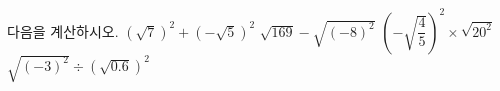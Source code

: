 다음을 계산하시오.
 $(\sqrt{7})^2+(-\sqrt{5})^2$
 $\sqrt{169}-\sqrt{(-8)^2}$
 $\left(-\sqrt{\dfrac{4}{5}}\right)^2\times\sqrt{20^2}$
 $\sqrt{(-3)^2}\div(\sqrt{0.6})^2$
